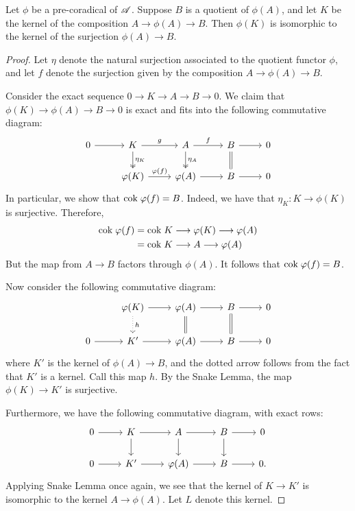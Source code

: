 \begin{prop}
Let $\phi$ be a pre-coradical of $\mathscr{A}$. Suppose $B$ is a 
quotient of $\phi(A)$, and let $K$ be the kernel of the 
composition $A \to \phi(A) \to B$. Then $\phi(K)$ is isomorphic 
to the kernel of the surjection $\phi(A) \to B$.
\end{prop}
\begin{proof}
Let $\eta$ denote the natural surjection associated to the 
quotient functor $\phi$, and let $f$ denote the surjection given 
by the composition $A \to \phi(A) \to B$.

Consider the exact sequence $0 \to K \to A \to B \to 0$. We claim
that $\phi(K) \to \phi(A) \to B \to 0$ is exact and fits into the 
following commutative diagram:
\[
\begin{tikzcd}
0 \arrow{r} &
K \arrow{r}{g} \arrow[twoheadrightarrow]{d}{\eta_K} &
A \arrow{r}{f} \arrow[twoheadrightarrow]{d}{\eta_A} &
B \arrow{r} \arrow[equal]{d} &
0 \\
& \phi(K) \arrow{r}{\phi(f)} &
\phi(A) \arrow{r} &
B \arrow{r} &
0
\end{tikzcd}
\]
In particular, we show that $\mathrm{cok}\; \varphi(f) = B$. Indeed, we have
that $\eta_K: K \to \phi(K)$ is surjective. Therefore,
\begin{align*}
\mathrm{cok}\; \varphi(f) &= \mathrm{cok}\; K \longrightarrow \varphi(K) \longrightarrow \varphi(A) \\
             &= \mathrm{cok}\; K \longrightarrow A \longrightarrow \varphi(A)
\end{align*}
But the map from $A \to B$ factors through $\phi(A)$. It follows
that $\mathrm{cok}\; \varphi(f) = B$.

Now consider the following commutative diagram:
\[
\begin{tikzcd}
{}
&\phi(K) \arrow{r} \arrow[dotted]{d}{h}
&\phi(A) \arrow{r} \arrow[equals]{d}
&B \arrow{r} \arrow[equals]{d}
&0\\
0 \arrow{r}
& K' \arrow{r}
&\phi(A) \arrow{r}
&B \arrow{r}
&0
\end{tikzcd}
\]
where $K'$ is the kernel of $\phi(A) \to B$, and the dotted arrow
follows from the fact that $K'$ is a kernel. Call this map $h$. 
By the Snake Lemma, the map $\phi(K) \to K'$ is surjective.

Furthermore, we have the following commutative diagram, with
exact rows:
\[
\begin{tikzcd}
0 \arrow{r} &
K \arrow{r} \arrow{d} &
A \arrow{r} \arrow{d} &
B \arrow{r} \arrow{d} &
0 \\
0 \arrow{r} &
K' \arrow{r} &
\phi(A) \arrow{r} &
B \arrow{r} &
0.
\end{tikzcd}
\]
Applying Snake Lemma once again, we see that the kernel of $K \to 
K'$ is isomorphic to the kernel $A \to \phi(A)$. Let $L$ denote
this kernel.


\end{proof}
